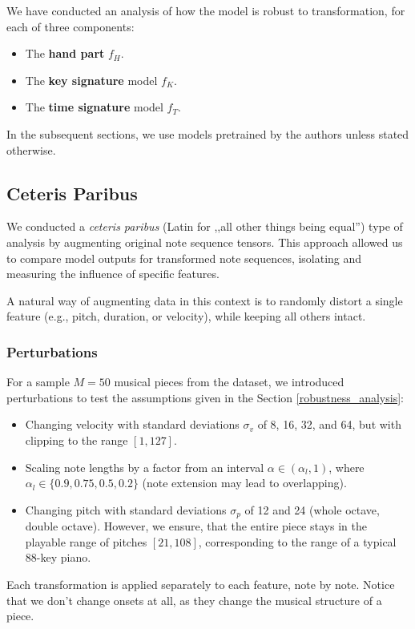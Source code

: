 We have conducted an analysis of how the model is robust to transformation, for each of three components: \begin{itemize}
	\item The \textbf{hand part} $f_H$.
	\item The \textbf{key signature} model $f_K$.
	\item The \textbf{time signature} model $f_T$.
\end{itemize} In the subsequent sections, we use models pretrained by the authors unless stated otherwise.

\subsection{Ceteris Paribus}

We conducted a \emph{ceteris paribus} (Latin for ,,all other things being equal'') type of analysis by augmenting original note sequence tensors. This approach allowed us to compare model outputs for transformed note sequences, isolating and measuring the influence of specific features.

A natural way of augmenting data in this context is to randomly distort a single feature (e.g., pitch, duration, or velocity), while keeping all others intact.

\subsubsection{Perturbations} \label{perturbations}

For a sample $M = 50$ musical pieces from the dataset, we introduced perturbations to test the assumptions given in the Section \ref{robustness_analysis}: \begin{itemize}
	\item Changing velocity with standard deviations $\sigma_v$ of 8, 16, 32, and 64, but with clipping to the range $[1, 127]$.
	\item Scaling note lengths by a factor from an interval $\alpha\in(\alpha_l,1)$, where $\alpha_l\in\{0.9, 0.75, 0.5, 0.2\}$ (note extension may lead to overlapping).
	\item Changing pitch with standard deviations $\sigma_p$ of 12 and 24 (whole octave, double octave). However, we ensure, that the entire piece stays in the playable range of pitches $[21, 108]$, corresponding to the range of a typical $88$-key piano.
\end{itemize}

Each transformation is applied separately to each feature, note by note. Notice that we don't change onsets at all, as they change the musical structure of a piece.

